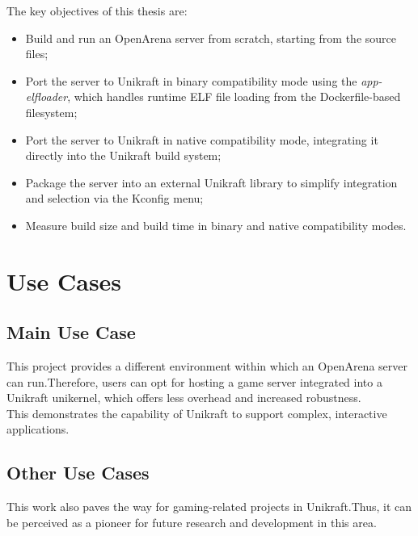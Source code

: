 The key objectives of this thesis are:
\begin{itemize}
    \item Build and run an OpenArena server from scratch, starting from the source files;
    \item Port the server to Unikraft in binary compatibility mode using the \textit{app-elfloader}, which handles runtime ELF file loading from the Dockerfile-based filesystem;
    \item Port the server to Unikraft in native compatibility mode, integrating it directly into the Unikraft build system;
    \item Package the server into an external Unikraft library to simplify integration and selection via the Kconfig menu;
    \item Measure build size and build time in binary and native compatibility modes.
\end{itemize}

\section{Use Cases}
\label{sec:usecases}

\subsection{Main Use Case}
\label{subsec:mainusecases}
This project provides a different environment within which an OpenArena server can run.\@ Therefore, users
can opt for hosting a game server integrated into a Unikraft unikernel, which offers less overhead and increased robustness. \\
This demonstrates the capability of Unikraft to support complex, interactive applications.

\subsection{Other Use Cases}
\label{subsec:otherusecases}
This work also paves the way for gaming-related projects in Unikraft.\@ Thus, it can be perceived
as a pioneer for future research and development in this area.

